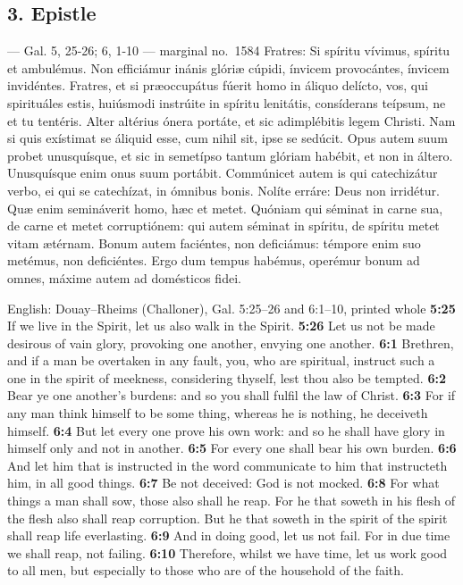 \elementguard
\subsection*{3. Epistle }

\begin{appointedlatin}{ --- Gal. 5, 25-26; 6, 1-10 --- marginal no.\ 1584}
Fratres: Si spíritu vívimus, spíritu et ambulémus. Non efficiámur inánis glóriæ
cúpidi, ínvicem provocántes, ínvicem invidéntes. Fratres, et si præoccupátus
fúerit homo in áliquo delícto, vos, qui spirituáles estis, huiúsmodi instrúite
in spíritu lenitátis, consíderans teípsum, ne et tu tentéris. Alter altérius
ónera portáte, et sic adimplébitis legem Christi. Nam si quis exístimat se
áliquid esse, cum nihil sit, ipse se sedúcit. Opus autem suum probet
unusquísque, et sic in semetípso tantum glóriam habébit, et non in áltero.
Unusquísque enim onus suum portábit. Commúnicet autem is qui catechizátur
verbo, ei qui se catechízat, in ómnibus bonis. Nolíte erráre: Deus non
irridétur. Quæ enim semináverit homo, hæc et metet. Quóniam qui séminat in
carne sua, de carne et metet corruptiónem: qui autem séminat in spíritu, de
spíritu metet vitam ætérnam. Bonum autem faciéntes, non deficiámus: témpore
enim suo metémus, non deficiéntes. Ergo dum tempus habémus, operémur bonum ad
omnes, máxime autem ad domésticos fidei.
\end{appointedlatin}

\begin{namedtranslation}{English: Douay--Rheims (Challoner), Gal. 5:25--26 and 6:1--10, printed whole}
\textbf{5:25} If we live in the Spirit, let us also walk in the Spirit.
\textbf{5:26} Let us not be made desirous of vain glory, provoking one another,
envying one another. \textbf{6:1} Brethren, and if a man be overtaken in any
fault, you, who are spiritual, instruct such a one in the spirit of meekness,
considering thyself, lest thou also be tempted. \textbf{6:2} Bear ye one
another's burdens: and so you shall fulfil the law of Christ. \textbf{6:3} For
if any man think himself to be some thing, whereas he is nothing, he deceiveth
himself. \textbf{6:4} But let every one prove his own work: and so he shall have
glory in himself only and not in another. \textbf{6:5} For every one shall bear
his own burden. \textbf{6:6} And let him that is instructed in the word
communicate to him that instructeth him, in all good things. \textbf{6:7} Be not
deceived: God is not mocked. \textbf{6:8} For what things a man shall sow, those
also shall he reap. For he that soweth in his flesh of the flesh also shall reap
corruption. But he that soweth in the spirit of the spirit shall reap life
everlasting. \textbf{6:9} And in doing good, let us not fail. For in due time we
shall reap, not failing. \textbf{6:10} Therefore, whilst we have time, let us
work good to all men, but especially to those who are of the household of the
faith.
\end{namedtranslation}

